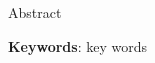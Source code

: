 
\begin{resumo}[ABSTRACT]
\begin{SingleSpacing}


Abstract

\vspace{1cm}
		
\textbf{Keywords}: key words

\end{SingleSpacing}
\end{resumo}

